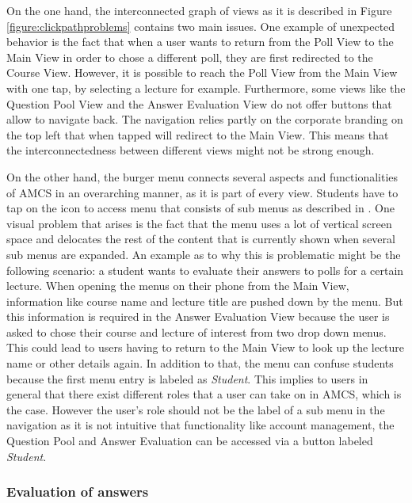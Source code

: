 On the one hand, the interconnected graph of views as it is described in Figure \ref{figure:clickpathproblems} contains two main issues. One example of unexpected behavior is the fact that when a user wants to return from the Poll View to the Main View in order to chose a different poll, they are first redirected to the Course View. However, it is possible to reach the Poll View from the Main View with one tap, by selecting a lecture for example. Furthermore, some views like the Question Pool View and the Answer Evaluation View do not offer buttons that allow to navigate back. The navigation relies partly on the corporate branding on the top left that when tapped will redirect to the Main View.
This means that the interconnectedness between different views might not be strong enough.

On the other hand, the burger menu connects several aspects and functionalities of AMCS in an overarching manner, as it is part of every view. Students have to tap on the icon to access menu that consists of sub menus as described in \todosct. 
One visual problem that arises is the fact that the menu uses a lot of vertical screen space and delocates the rest of the content that is currently shown when several sub menus are expanded. An example as to why this is problematic might be the following scenario: a student wants to evaluate their answers to polls for a certain lecture. When opening the menus on their phone from the Main View, information like course name and lecture title are pushed down by the menu. But this information is required in the Answer Evaluation View because the user is asked to chose their course and lecture of interest from two drop down menus. This could lead to users having to return to the Main View to look up the lecture name or other details again.
In addition to that, the menu can confuse students because the first menu entry is labeled as \emph{Student}. This implies to users in general that there exist different roles that a user can take on in AMCS, which is the case. However the user's role should not be the label of a sub menu in the navigation as it is not intuitive that functionality like account management, the Question Pool and Answer Evaluation can be accessed via a button labeled \emph{Student}.

\subsubsection{Evaluation of answers}

